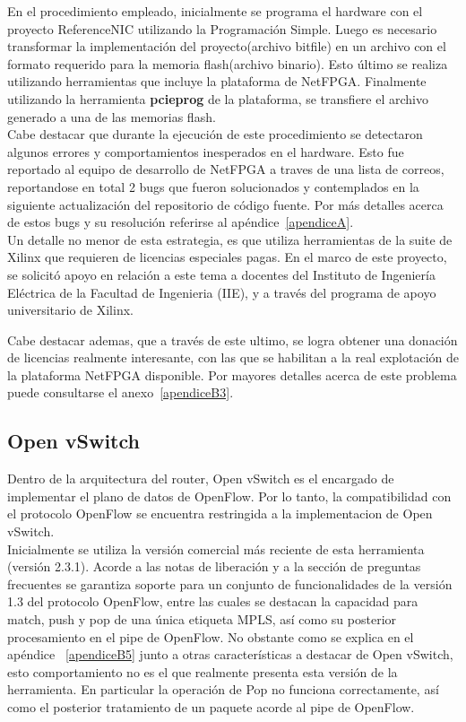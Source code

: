 En el procedimiento empleado, inicialmente se programa el hardware con el proyecto ReferenceNIC utilizando la Programaci\'on Simple. Luego es necesario transformar la implementaci\'on del proyecto(archivo bitfile) en un archivo con el formato requerido para la memoria flash(archivo binario). Esto \'ultimo se realiza utilizando herramientas que incluye la plataforma de NetFPGA. Finalmente utilizando la herramienta \textbf{pcieprog} de la plataforma, se transfiere el archivo generado a una de las memorias flash.\\

Cabe destacar que durante la ejecuci\'on de este procedimiento se detectaron algunos errores y comportamientos inesperados en el hardware. Esto fue reportado al equipo de desarrollo de NetFPGA a traves de una lista de correos, reportandose en total 2 bugs que fueron solucionados y contemplados en la siguiente actualizaci\'on del repositorio de c\'odigo fuente. Por m\'as detalles acerca de estos bugs y su resoluci\'on referirse al ap\'endice~\ref{apendiceA}.\\

Un detalle no menor de esta estrategia, es que utiliza herramientas de la suite de Xilinx que requieren de licencias especiales pagas. En el marco de este proyecto, se solicit\'o apoyo en relaci\'on a este tema a docentes del Instituto de Ingeniería Eléctrica de la Facultad de Ingenieria (IIE), y a través del programa de apoyo universitario de Xilinx. 

Cabe destacar ademas, que a través de este ultimo, se logra obtener una donación de licencias realmente interesante, con las que se habilitan a la real explotación de la plataforma NetFPGA disponible. Por mayores detalles acerca de este problema puede consultarse el anexo~\ref{apendiceB3}.\\

\subsection{Open vSwitch}
Dentro de la arquitectura del router, Open vSwitch es el encargado de implementar el plano de datos de OpenFlow. Por lo tanto, la compatibilidad con el protocolo OpenFlow se encuentra restringida a la implementacion de Open vSwitch.\\

Inicialmente se utiliza la versi\'on comercial m\'as reciente de esta herramienta (versi\'on 2.3.1). Acorde a las notas de liberaci\'on y a la secci\'on de preguntas frecuentes se garantiza soporte para un conjunto de funcionalidades de la versi\'on 1.3 del protocolo OpenFlow, entre las cuales se destacan la capacidad para match, push y pop de una \'unica etiqueta MPLS, así como su posterior procesamiento en el pipe de OpenFlow. No obstante como se explica en el apéndice ~\ref{apendiceB5} junto a otras características a destacar de Open vSwitch, esto comportamiento no es el que realmente presenta esta versi\'on de la herramienta. En particular la operación de Pop no funciona correctamente, así como el posterior tratamiento de un paquete acorde al pipe de OpenFlow.\\ 

